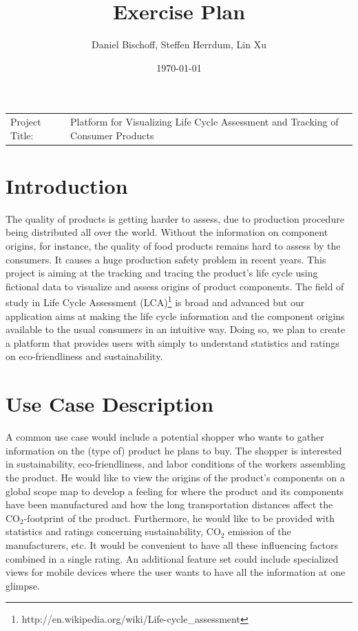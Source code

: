 \documentclass[a4page]{article}
\author{Daniel Bischoff, Steffen Herrdum, Lin Xu}
\title{Exercise Plan}
\date{\today}
\begin{document}
\maketitle

\begin{table}[!th]
\begin{tabular}{l p{}}

Project Title: & Platform for Visualizing Life Cycle Assessment and Tracking of Consumer Products \\

\end{tabular}
\end{table}

\section{Introduction}
The quality of products is getting harder to assess, due to production procedure being distributed all over the world.
Without the information on component origins, for instance, the quality of food products remains hard to assess by the consumers.
It causes a huge production safety problem in recent years.
This project is aiming at the tracking and tracing the product's life cycle using fictional data to visualize and assess origins of product components.
The field of study in Life Cycle Assessment (LCA)\footnote{http://en.wikipedia.org/wiki/Life-cycle\_assessment} is broad and advanced but our application aims at making the life cycle information and the component origins available to the usual consumers in an intuitive way.
Doing so, we plan to create a platform that provides users with simply to understand statistics and ratings on eco-friendliness and sustainability.

\section{Use Case Description}
A common use case would include a potential shopper who wants to gather information on the (type of) product he plans to buy.
The shopper is interested in sustainability, eco-friendliness, and labor conditions of the workers assembling the product.
He would like to view the origins of the product's components on a global scope map to develop a feeling for where the product and its components have been manufactured and how the long transportation distances affect the $\mathrm{CO}_2$-footprint of the product.
Furthermore, he would like to be provided with statistics and ratings concerning sustainability, $\mathrm{CO}_2$ emission of the manufacturers, etc.
It would be convenient to have all these influencing factors combined in a single rating.
An additional feature set could include specialized views for mobile devices where the user wants to have all the information at one glimpse.
\end{document}
